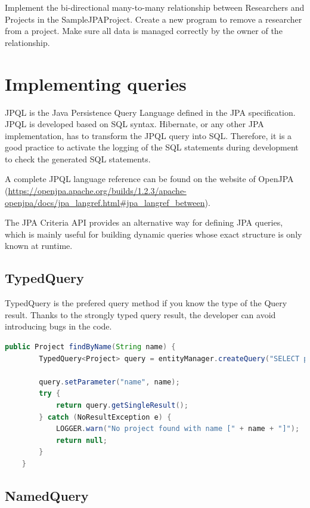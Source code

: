 \begin{oefening}
Implement the bi-directional many-to-many relationship between Researchers and Projects in the SampleJPAProject. Create a new program to remove a researcher from a project.  Make sure all data is managed correctly by the owner of the relationship.
\end{oefening}

\section{Implementing queries}

JPQL is the Java Persistence Query Language defined in the JPA specification. 
JPQL is developed based on SQL syntax.  Hibernate, or any other JPA implementation, has to transform the JPQL query into SQL.  Therefore,  it is a good practice to activate the logging of the SQL statements during development to check the generated SQL statements.

A complete JPQL language reference can be found on the website of OpenJPA (\url{https://openjpa.apache.org/builds/1.2.3/apache-openjpa/docs/jpa_langref.html#jpa_langref_between}).

The JPA Criteria API provides an alternative way for defining JPA queries, which is mainly useful for building dynamic queries whose exact structure is only known at runtime.  

\subsection{TypedQuery}

TypedQuery is the prefered query method if you know the type of the Query result.  Thanks to the strongly typed query result,  the developer can avoid introducing bugs in the code. 

\begin{lstlisting}[frame=single, language=java]
	public Project findByName(String name) {
		TypedQuery<Project> query = entityManager.createQuery("SELECT p FROM Project p WHERE p.name = :name", Project.class);

		query.setParameter("name", name);
		try {
			return query.getSingleResult();
		} catch (NoResultException e) {
			LOGGER.warn("No project found with name [" + name + "]");
			return null;
		}
	}
\end{lstlisting}


\subsection{NamedQuery}

